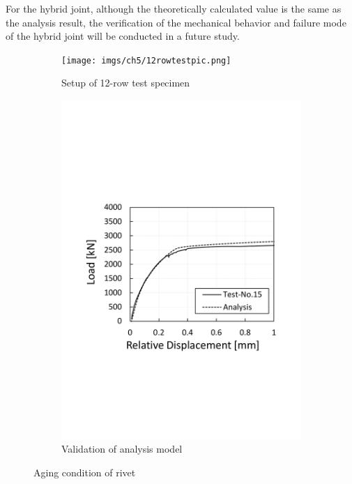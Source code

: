For the hybrid joint, although the theoretically calculated value is the same as the analysis result, the verification of the mechanical behavior and failure mode of the hybrid joint will be conducted in a future study.

\begin{figure}[htbp]
    \centering
    \begin{subfigure}[t]{0.4\textwidth}
        \centering
        \texttt{[image: imgs/ch5/12rowtestpic.png]}
        \caption{Setup of 12-row test specimen}
        \label{fig-testset}
    \end{subfigure}
    \hfill
    \begin{subfigure}[t]{0.55\textwidth}
        \centering
        \includegraphics[width=\linewidth]{imgs/ch5/validation.pdf}
        \caption{Validation of analysis model}
        \label{fig-validloadrd}
    \end{subfigure}
    \caption{Aging condition of rivet}
\end{figure}

